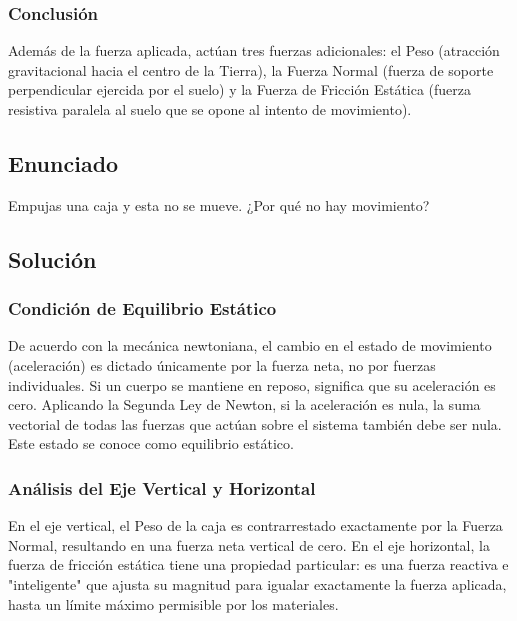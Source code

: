 \documentclass[12pt]{article}
\begin{document}
\subsubsection*{Conclusión}
Además de la fuerza aplicada, actúan tres fuerzas adicionales: el Peso (atracción gravitacional hacia el centro de la Tierra), la Fuerza Normal (fuerza de soporte perpendicular ejercida por el suelo) y la Fuerza de Fricción Estática (fuerza resistiva paralela al suelo que se opone al intento de movimiento).

\newpage

\subsection*{Enunciado}
Empujas una caja y esta no se mueve. ¿Por qué no hay movimiento?

\subsection*{Solución}

\subsubsection*{Condición de Equilibrio Estático}
De acuerdo con la mecánica newtoniana, el cambio en el estado de movimiento (aceleración) es dictado únicamente por la fuerza neta, no por fuerzas individuales. Si un cuerpo se mantiene en reposo, significa que su aceleración es cero. Aplicando la Segunda Ley de Newton, si la aceleración es nula, la suma vectorial de todas las fuerzas que actúan sobre el sistema también debe ser nula. Este estado se conoce como equilibrio estático.

\subsubsection*{Análisis del Eje Vertical y Horizontal}
En el eje vertical, el Peso de la caja es contrarrestado exactamente por la Fuerza Normal, resultando en una fuerza neta vertical de cero. En el eje horizontal, la fuerza de fricción estática tiene una propiedad particular: es una fuerza reactiva e "inteligente" que ajusta su magnitud para igualar exactamente la fuerza aplicada, hasta un límite máximo permisible por los materiales.
\end{document}
